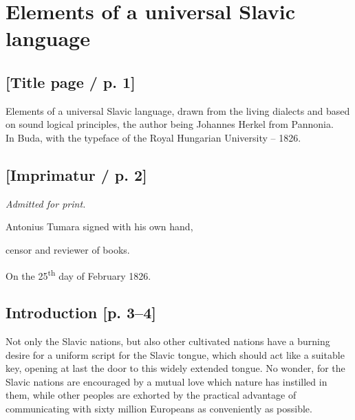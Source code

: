 \chapter{Elements of a universal Slavic language}

\section*{[Title page / p. 1]}

Elements of a universal Slavic language, drawn from the living dialects and based on sound logical principles, the author being Johannes Herkel from Pannonia. \\

\noindent In Buda, with the typeface of the Royal Hungarian University -- 1826.

\section*{[Imprimatur / p. 2]}

\begin{center}
    \textit{Admitted for print.}
\end{center}
\begin{flushright}
    Antonius Tumara signed with his own hand,
    
    censor and reviewer of books.
    
    On the 25\textsuperscript{th} day of February 1826.
\end{flushright}

\section*{Introduction [p. 3--4]}

Not only the Slavic nations, but also other cultivated nations have a burning desire for a uniform script for the Slavic tongue, which should act like a suitable key, opening at last the door to this widely extended tongue. No wonder, for the Slavic nations are encouraged by a mutual love which nature has instilled in them, while other peoples are exhorted by the practical advantage of communicating with sixty million Europeans as conveniently as possible.

